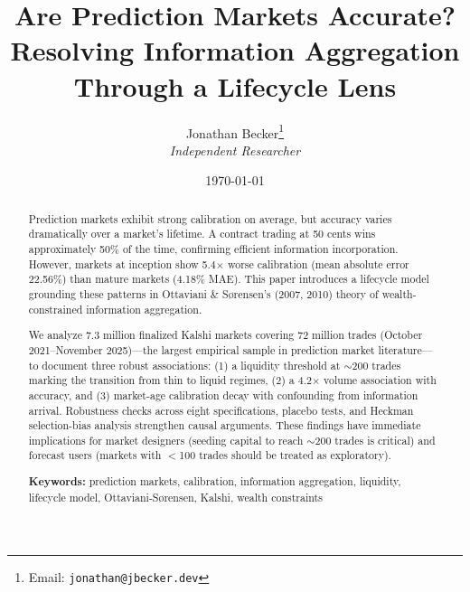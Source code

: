 \title{\textbf{Are Prediction Markets Accurate? Resolving Information Aggregation Through a Lifecycle Lens}}
\author{Jonathan Becker\thanks{Email: \texttt{jonathan@jbecker.dev}} \\ \vspace{0.3cm} \textit{Independent Researcher}}
\date{\today}

\maketitle

\begin{abstract}

Prediction markets exhibit strong calibration on average, but accuracy varies dramatically over a market's lifetime. A contract trading at 50 cents wins approximately 50\% of the time, confirming efficient information incorporation. However, markets at inception show 5.4$\times$ worse calibration (mean absolute error 22.56\%) than mature markets (4.18\% MAE). This paper introduces a lifecycle model grounding these patterns in Ottaviani \& Sørensen's (2007, 2010) theory of wealth-constrained information aggregation.

We analyze 7.3 million finalized Kalshi markets covering 72 million trades (October 2021--November 2025)---the largest empirical sample in prediction market literature---to document three robust associations: (1) a liquidity threshold at $\sim$200 trades marking the transition from thin to liquid regimes, (2) a 4.2$\times$ volume association with accuracy, and (3) market-age calibration decay with confounding from information arrival. Robustness checks across eight specifications, placebo tests, and Heckman selection-bias analysis strengthen causal arguments. These findings have immediate implications for market designers (seeding capital to reach $\sim$200 trades is critical) and forecast users (markets with $<$100 trades should be treated as exploratory).

\noindent\textbf{Keywords:} prediction markets, calibration, information aggregation, liquidity, lifecycle model, Ottaviani-Sørensen, Kalshi, wealth constraints

\end{abstract}

